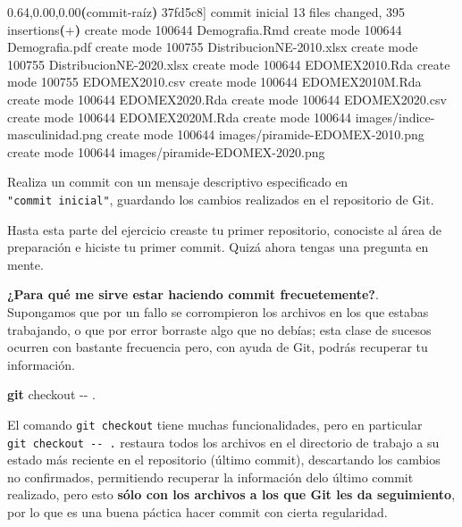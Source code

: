 \documentclass[
]{book}
\newenvironment{Shaded}{\begin{snugshade}}{\end{snugshade}}
\newcommand{\AttributeTok}[1]{\textcolor[rgb]{0.13,0.29,0.53}{#1}}
\newcommand{\ErrorTok}[1]{\textcolor[rgb]{0.64,0.00,0.00}{\textbf{#1}}}
\newcommand{\ExtensionTok}[1]{#1}
\newcommand{\FunctionTok}[1]{\textcolor[rgb]{0.13,0.29,0.53}{\textbf{#1}}}
\newcommand{\KeywordTok}[1]{\textcolor[rgb]{0.13,0.29,0.53}{\textbf{#1}}}
\newcommand{\NormalTok}[1]{#1}
\begin{document}
\begin{Shaded}
\begin{Highlighting}[]
\ExtensionTok{[main} \ErrorTok{(}\ExtensionTok{commit{-}raíz}\KeywordTok{)} \ExtensionTok{37fd5c8]}\NormalTok{ commit inicial}
 \ExtensionTok{13}\NormalTok{ files changed, 395 insertions}\ErrorTok{(}\ExtensionTok{+}\KeywordTok{)}
 \ExtensionTok{create}\NormalTok{ mode 100644 Demografia.Rmd}
 \ExtensionTok{create}\NormalTok{ mode 100644 Demografia.pdf}
 \ExtensionTok{create}\NormalTok{ mode 100755 DistribucionNE{-}2010.xlsx}
 \ExtensionTok{create}\NormalTok{ mode 100755 DistribucionNE{-}2020.xlsx}
 \ExtensionTok{create}\NormalTok{ mode 100644 EDOMEX2010.Rda}
 \ExtensionTok{create}\NormalTok{ mode 100755 EDOMEX2010.csv}
 \ExtensionTok{create}\NormalTok{ mode 100644 EDOMEX2010M.Rda}
 \ExtensionTok{create}\NormalTok{ mode 100644 EDOMEX2020.Rda}
 \ExtensionTok{create}\NormalTok{ mode 100644 EDOMEX2020.csv}
 \ExtensionTok{create}\NormalTok{ mode 100644 EDOMEX2020M.Rda}
 \ExtensionTok{create}\NormalTok{ mode 100644 images/indice{-}masculinidad.png}
 \ExtensionTok{create}\NormalTok{ mode 100644 images/piramide{-}EDOMEX{-}2010.png}
 \ExtensionTok{create}\NormalTok{ mode 100644 images/piramide{-}EDOMEX{-}2020.png}
\end{Highlighting}
\end{Shaded}

Realiza un commit con un mensaje descriptivo especificado en \texttt{"commit\ inicial"}, guardando los cambios realizados en el repositorio de Git.

Hasta esta parte del ejercicio creaste tu primer repositorio, conociste al área de preparación e hiciste tu primer commit.
Quizá ahora tengas una pregunta en mente.

\textbf{¿Para qué me sirve estar haciendo commit frecuetemente?}.\\
Supongamos que por un fallo se corrompieron los archivos en los que estabas trabajando, o que por error borraste algo que no debías; esta clase de sucesos ocurren con bastante frecuencia pero, con ayuda de Git, podrás recuperar tu información.

\begin{Shaded}
\begin{Highlighting}[]
\FunctionTok{git}\NormalTok{ checkout }\AttributeTok{{-}{-}}\NormalTok{ .}
\end{Highlighting}
\end{Shaded}

El comando \texttt{git\ checkout} tiene muchas funcionalidades, pero en particular \texttt{git\ checkout\ -\/-\ .} restaura todos los archivos en el directorio de trabajo a su estado más reciente en el repositorio (último commit), descartando los cambios no confirmados, permitiendo recuperar la información delo último commit realizado, pero esto \textbf{sólo con los archivos a los que Git les da seguimiento}, por lo que es una buena páctica hacer commit con cierta regularidad.
\end{document}
